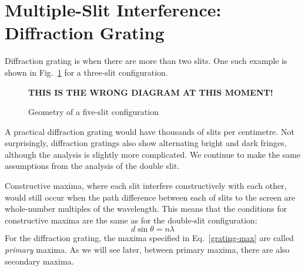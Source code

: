 \section{Multiple-Slit Interference: Diffraction Grating}
Diffraction grating is when there are more than two slits. One such example is
shown in Fig.~\ref{fig:3-slit} for a three-slit configuration.
\begin{figure}[ht]
  \centering
  
  \textbf{THIS IS THE WRONG DIAGRAM AT THIS MOMENT!}
  \caption{Geometry of a five-slit configuration}
  \label{fig:3-slit}
\end{figure}
A practical diffraction grating would have thousands of slits per centimetre.
Not surprisingly, diffraction gratings also show alternating bright and dark
fringes, although the analysis is slightly more complicated. We continue to
make the same assumptions from the analysis of the double slit.

Constructive maxima, where each slit interfere constructively with each other,
would still occur when the path difference between each of slits to the screen
are whole-number multiples of the wavelength. This means that the conditions
for constructive maxima are the same as for the double-slit configuration:
\begin{equation}
  d\sin\theta=n\lambda
  \label{grating-max}
\end{equation}
For the diffraction grating, the maxima specified in Eq.~\ref{grating-max} are
called \emph{primary} maxima. As we will see later, between primary maxima,
there are also secondary maxima.

